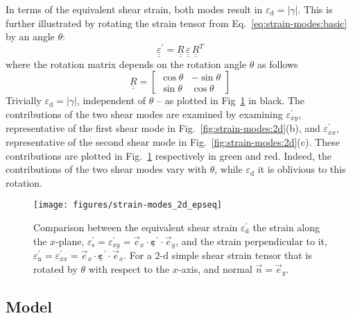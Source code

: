 \documentclass[times,namecite]{goose-article}
\newcommand\T[1]{\underline{\bm{{#1}}}}
\begin{document}
In terms of the equivalent shear strain, both modes result in $\varepsilon_\mathrm{d} = | \gamma |$. This is further illustrated by rotating the strain tensor from Eq.~\eqref{eq:strain-modes:basic} by an angle $\theta$:
\begin{equation}
    \underline{\underline{\varepsilon}}^\prime
    =
    \underline{\underline{R}} \,
    \underline{\underline{\varepsilon}} \,
    \underline{\underline{R}}^T
\end{equation}
where the rotation matrix depends on the rotation angle $\theta$ as follows
\begin{equation}
    \underline{\underline{R}}
    =
    \begin{bmatrix}
        \cos \theta & - \sin \theta \\
        \sin \theta & \cos \theta
    \end{bmatrix}
\end{equation}
Trivially $\varepsilon_\mathrm{d} = | \gamma |$, independent of $\theta$ -- as plotted in Fig~\ref{fig:shear-modes:epseq} in black. The contributions of the two shear modes are examined by examining $\varepsilon^\prime_{xy}$, representative of the first shear mode in Fig.~\ref{fig:strain-modes:2d}(b), and $\varepsilon^\prime_{xx}$, representative of the second shear mode in Fig.~\ref{fig:strain-modes:2d}(c). These contributions are plotted in Fig.~\ref{fig:shear-modes:epseq} respectively in green and red. Indeed, the contributions of the two shear modes vary with $\theta$, while $\varepsilon_\mathrm{d}$ it is oblivious to this rotation.

\begin{figure}[htp]
    \centering
    \texttt{[image: figures/strain-modes\_2d\_epseq]}
    \caption{Comparison between the equivalent shear strain $\varepsilon_\mathrm{d}^\prime$ the strain along the $x$-plane, $\varepsilon_\mathrm{s}^\prime = \varepsilon_{xy}^\prime = \vec{e}_x \cdot \T{\varepsilon}^\prime \cdot \vec{e}_y$, and the strain perpendicular to it, $\varepsilon_\mathrm{n}^\prime = \varepsilon_{xx}^\prime = \vec{e}_x \cdot \T{\varepsilon}^\prime \cdot \vec{e}_x$. For a 2-d simple shear strain tensor that is rotated by $\theta$ with respect to the $x$-axis, and normal $\vec{n} = \vec{e}_y$.}
    \label{fig:shear-modes:epseq}
\end{figure}

\subsection{Model}
\end{document}
